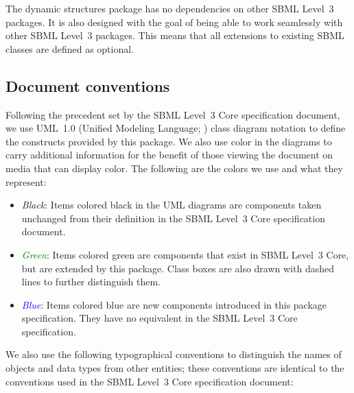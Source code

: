 The dynamic structures package has no dependencies on other SBML Level~3 packages. It is also designed with the goal of being able to work seamlessly with other SBML Level~3 packages. This means that all extensions to existing SBML classes are defined as optional.

\subsection{Document conventions}
\label{subsec:conventions}

Following the precedent set by the SBML Level~3 Core specification
document, we use UML~1.0 (Unified Modeling Language;
\citealt{eriksson:1998,oestereich:1999}) class diagram notation to
define the constructs provided by this package.  We also use color in
the diagrams to carry additional information for the benefit of those
viewing the document on media that can display color.  The following are
the colors we use and what they represent:

\begin{itemize}

\item[\raisebox{2.75pt}{\colorbox{black}{\rule{0.8pt}{0.8pt}}}]
  \emph{Black}: Items colored black in the UML diagrams are components
  taken unchanged from their definition in the SBML Level~3 Core
  specification document.

\item[\raisebox{2.75pt}{\colorbox{green}{\rule{0.8pt}{0.8pt}}}]
  \emph{\textcolor{green}{Green}}: Items colored green are
  components that exist in SBML Level~3 Core, but are extended by this
  package.  Class boxes are also drawn with dashed lines to further
  distinguish them.

\item[\raisebox{2.75pt}{\colorbox{blue}{\rule{0.8pt}{0.8pt}}}]
  \emph{\textcolor{blue}{Blue}}: Items colored blue are new
  components introduced in this package specification.  They have no
  equivalent in the SBML Level~3 Core specification.

\end{itemize}

We also use the following typographical conventions to distinguish the
names of objects and data types from other entities; these conventions
are identical to the conventions used in the SBML Level~3 Core specification
document:

